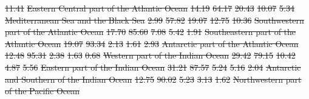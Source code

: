 \documentclass[12pt,authoryear]{elsarticle}
\providecommand{\DIFdeltex}[1]{{\protect\color{red}\sout{#1}}}                      %
\providecommand{\DIFdelFL}[1]{\DIFdel{#1}} %
\providecommand{\DIFdel}[1]{\texorpdfstring{\DIFdeltex{#1}}{}} %
\begin{document}
\begin{table}[h]
\DIFdelFL{11.41 }%
\DIFdelFL{Eastern Central part of the Atlantic Ocean }%
\DIFdelFL{14.19 }%
\DIFdelFL{64.17 }%
\DIFdelFL{20.43 }%
\DIFdelFL{10.07 }%
\DIFdelFL{5.34 }%
\DIFdelFL{Mediterranean Sea and the Black Sea        }%
\DIFdelFL{2.99 }%
\DIFdelFL{57.82 }%
\DIFdelFL{19.07 }%
\DIFdelFL{12.75 }%
\DIFdelFL{10.36 }%
\DIFdelFL{Southwestern part of the Atlantic Ocean    }%
\DIFdelFL{17.70 }%
\DIFdelFL{85.60 }%
\DIFdelFL{7.08 }%
\DIFdelFL{5.42 }%
\DIFdelFL{1.91 }%
\DIFdelFL{Southeastern part of the Atlantic Ocean    }%
\DIFdelFL{19.07 }%
\DIFdelFL{93.34 }%
\DIFdelFL{2.13 }%
\DIFdelFL{1.61 }%
\DIFdelFL{2.93 }%
\DIFdelFL{Antarctic part of the Atlantic Ocean       }%
\DIFdelFL{12.48 }%
\DIFdelFL{95.31 }%
\DIFdelFL{2.38 }%
\DIFdelFL{1.63 }%
\DIFdelFL{0.68 }%
\DIFdelFL{Western part of the Indian Ocean           }%
\DIFdelFL{29.42 }%
\DIFdelFL{79.15 }%
\DIFdelFL{10.42 }%
\DIFdelFL{4.87 }%
\DIFdelFL{5.56 }%
\DIFdelFL{Eastern part of the Indian Ocean           }%
\DIFdelFL{31.21 }%
\DIFdelFL{87.57 }%
\DIFdelFL{5.24 }%
\DIFdelFL{5.16 }%
\DIFdelFL{2.04 }%
\DIFdelFL{Antarctic and Southern of the Indian Ocean }%
\DIFdelFL{12.75 }%
\DIFdelFL{90.02 }%
\DIFdelFL{5.23 }%
\DIFdelFL{3.13 }%
\DIFdelFL{1.62 }%
\DIFdelFL{Northwestern part of the Pacific Ocean     }%

\end{table}
\end{document}
